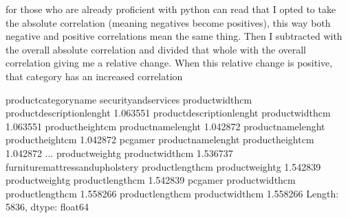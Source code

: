\documentclass[letterpaper,10pt,english]{jupyterBook}
\begin{document}
\sphinxAtStartPar
for those who are already proficient with python can read that I opted to take the absolute correlation (meaning negatives become positives), this way both negative and positive correlations mean the same thing. Then I subtracted with the overall absolute correlation and divided that whole with the overall correlation giving me a relative change. When this relative change is positive, that category has an increased correlation

\begin{sphinxVerbatim}[commandchars=\\\{\}]
  
\end{sphinxVerbatim}

\begin{sphinxVerbatim}[commandchars=\\\{\}]
product\PYGZus{}category\PYGZus{}name                                                                    
security\PYGZus{}and\PYGZus{}services              product\PYGZus{}width\PYGZus{}cm            product\PYGZus{}description\PYGZus{}lenght    1.063551
                                   product\PYGZus{}description\PYGZus{}lenght  product\PYGZus{}width\PYGZus{}cm              1.063551
                                   product\PYGZus{}height\PYGZus{}cm           product\PYGZus{}name\PYGZus{}lenght           1.042872
                                   product\PYGZus{}name\PYGZus{}lenght         product\PYGZus{}height\PYGZus{}cm             1.042872
pc\PYGZus{}gamer                           product\PYGZus{}name\PYGZus{}lenght         product\PYGZus{}height\PYGZus{}cm             1.042872
                                                                                               ...   
                                   product\PYGZus{}weight\PYGZus{}g            product\PYGZus{}width\PYGZus{}cm             \PYGZhy{}1.536737
furniture\PYGZus{}mattress\PYGZus{}and\PYGZus{}upholstery  product\PYGZus{}length\PYGZus{}cm           product\PYGZus{}weight\PYGZus{}g             \PYGZhy{}1.542839
                                   product\PYGZus{}weight\PYGZus{}g            product\PYGZus{}length\PYGZus{}cm            \PYGZhy{}1.542839
pc\PYGZus{}gamer                           product\PYGZus{}width\PYGZus{}cm            product\PYGZus{}length\PYGZus{}cm            \PYGZhy{}1.558266
                                   product\PYGZus{}length\PYGZus{}cm           product\PYGZus{}width\PYGZus{}cm             \PYGZhy{}1.558266
Length: 5836, dtype: float64
\end{sphinxVerbatim}
\end{document}
